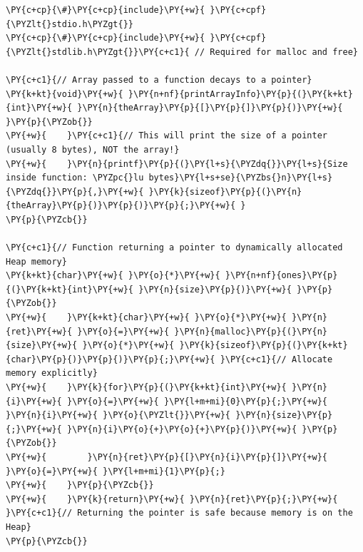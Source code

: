 \begin{Verbatim}[label=\makebox{\url{https://github.com/lucabaldini/cmepda/tree/master/slides/latex/snippets/arrays_and_malloc.c}},commandchars=\\\{\}]
\PY{c+cp}{\#}\PY{c+cp}{include}\PY{+w}{ }\PY{c+cpf}{\PYZlt{}stdio.h\PYZgt{}}
\PY{c+cp}{\#}\PY{c+cp}{include}\PY{+w}{ }\PY{c+cpf}{\PYZlt{}stdlib.h\PYZgt{}}\PY{c+c1}{ // Required for malloc and free}

\PY{c+c1}{// Array passed to a function decays to a pointer}
\PY{k+kt}{void}\PY{+w}{ }\PY{n+nf}{printArrayInfo}\PY{p}{(}\PY{k+kt}{int}\PY{+w}{ }\PY{n}{theArray}\PY{p}{[}\PY{p}{]}\PY{p}{)}\PY{+w}{ }\PY{p}{\PYZob{}}
\PY{+w}{    }\PY{c+c1}{// This will print the size of a pointer (usually 8 bytes), NOT the array!}
\PY{+w}{    }\PY{n}{printf}\PY{p}{(}\PY{l+s}{\PYZdq{}}\PY{l+s}{Size inside function: \PYZpc{}lu bytes}\PY{l+s+se}{\PYZbs{}n}\PY{l+s}{\PYZdq{}}\PY{p}{,}\PY{+w}{ }\PY{k}{sizeof}\PY{p}{(}\PY{n}{theArray}\PY{p}{)}\PY{p}{)}\PY{p}{;}\PY{+w}{ }
\PY{p}{\PYZcb{}}

\PY{c+c1}{// Function returning a pointer to dynamically allocated Heap memory}
\PY{k+kt}{char}\PY{+w}{ }\PY{o}{*}\PY{+w}{ }\PY{n+nf}{ones}\PY{p}{(}\PY{k+kt}{int}\PY{+w}{ }\PY{n}{size}\PY{p}{)}\PY{+w}{ }\PY{p}{\PYZob{}}
\PY{+w}{    }\PY{k+kt}{char}\PY{+w}{ }\PY{o}{*}\PY{+w}{ }\PY{n}{ret}\PY{+w}{ }\PY{o}{=}\PY{+w}{ }\PY{n}{malloc}\PY{p}{(}\PY{n}{size}\PY{+w}{ }\PY{o}{*}\PY{+w}{ }\PY{k}{sizeof}\PY{p}{(}\PY{k+kt}{char}\PY{p}{)}\PY{p}{)}\PY{p}{;}\PY{+w}{ }\PY{c+c1}{// Allocate memory explicitly}
\PY{+w}{    }\PY{k}{for}\PY{p}{(}\PY{k+kt}{int}\PY{+w}{ }\PY{n}{i}\PY{+w}{ }\PY{o}{=}\PY{+w}{ }\PY{l+m+mi}{0}\PY{p}{;}\PY{+w}{ }\PY{n}{i}\PY{+w}{ }\PY{o}{\PYZlt{}}\PY{+w}{ }\PY{n}{size}\PY{p}{;}\PY{+w}{ }\PY{n}{i}\PY{o}{+}\PY{o}{+}\PY{p}{)}\PY{+w}{ }\PY{p}{\PYZob{}}
\PY{+w}{        }\PY{n}{ret}\PY{p}{[}\PY{n}{i}\PY{p}{]}\PY{+w}{ }\PY{o}{=}\PY{+w}{ }\PY{l+m+mi}{1}\PY{p}{;}
\PY{+w}{    }\PY{p}{\PYZcb{}}
\PY{+w}{    }\PY{k}{return}\PY{+w}{ }\PY{n}{ret}\PY{p}{;}\PY{+w}{ }\PY{c+c1}{// Returning the pointer is safe because memory is on the Heap}
\PY{p}{\PYZcb{}}


\end{Verbatim}
